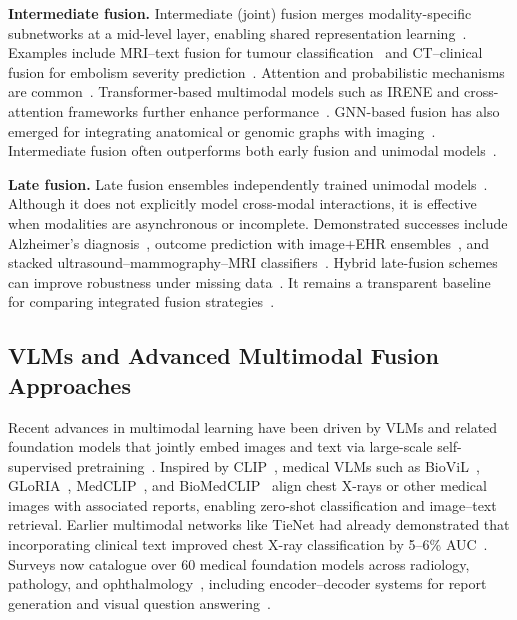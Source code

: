 \documentclass[final,british,a4paper,12pt]{phdthesis}
\begin{document}
\textbf{Intermediate fusion.} Intermediate (joint) fusion merges modality-specific subnetworks at a mid-level layer, enabling shared representation learning~\cite{mohsen2022artificial}. Examples include MRI–text fusion for tumour classification~\cite{he2021deep} and CT–clinical fusion for embolism severity prediction~\cite{grant2021deep}. Attention and probabilistic mechanisms are common~\cite{samak2020prediction,liu2022machine,kawahara2018seven}. Transformer-based multimodal models such as IRENE and cross-attention frameworks further enhance performance~\cite{khader2023multimodal,zhou2023transformer,khader2023medical}. GNN-based fusion has also emerged for integrating anatomical or genomic graphs with imaging~\cite{simon2025multimodal}. Intermediate fusion often outperforms both early fusion and unimodal models~\cite{mohsen2022artificial}.

\textbf{Late fusion.} Late fusion ensembles independently trained unimodal models~\cite{mohsen2022artificial}. Although it does not explicitly model cross-modal interactions, it is effective when modalities are asynchronous or incomplete. Demonstrated successes include Alzheimer’s diagnosis~\cite{qiu2018fusion}, outcome prediction with image+EHR ensembles~\cite{huang2020multimodal}, and stacked ultrasound–mammography–MRI classifiers~\cite{lu2024deep}. Hybrid late-fusion schemes can improve robustness under missing data~\cite{xiao2025novel}. It remains a transparent baseline for comparing integrated fusion strategies~\cite{mohsen2022artificial,huang2020multimodal}.

\subsection{VLMs and Advanced Multimodal Fusion Approaches} \label{sec:VLM}

Recent advances in multimodal learning have been driven by VLMs and related foundation models that jointly embed images and text via large-scale self-supervised pretraining~\cite{ryu2025vlmreview}. Inspired by CLIP~\cite{radford2021learning}, medical VLMs such as BioViL~\cite{boecking2022biovil,lyu2024language}, GLoRIA~\cite{huang2021gloria}, MedCLIP~\cite{park2020contrastive,wang2022medclip}, and BioMedCLIP~\cite{zhang2023biomedclip} align chest X-rays or other medical images with associated reports, enabling zero-shot classification and image–text retrieval. Earlier multimodal networks like TieNet had already demonstrated that incorporating clinical text improved chest X-ray classification by 5–6\% AUC~\cite{wang2018tienet}. Surveys now catalogue over 60 medical foundation models across radiology, pathology, and ophthalmology~\cite{ryu2025vlmreview}, including encoder–decoder systems for report generation and visual question answering~\cite{hartsock2024vlmreport,thawkar2023xraygpt}.
\end{document}
